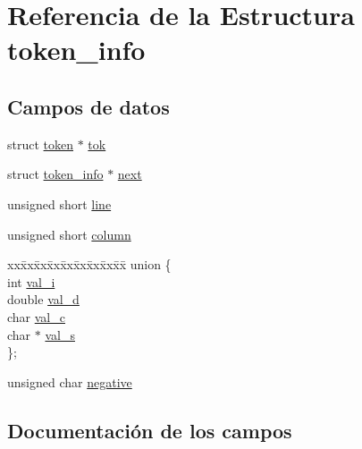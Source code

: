 \hypertarget{structtoken__info}{}\section{Referencia de la Estructura token\+\_\+info}
\label{structtoken__info}
\subsection*{Campos de datos}
\begin{DoxyCompactItemize}
\item 
struct \mbox{\hyperlink{structtoken}{token}} $\ast$ \mbox{\hyperlink{structtoken__info_a55f2da03def99d2cd8adb1f2d5cb1eb9}{tok}}
\item 
struct \mbox{\hyperlink{structtoken__info}{token\+\_\+info}} $\ast$ \mbox{\hyperlink{structtoken__info_a8ae533e40ed837711592f2ccd0fbdaa7}{next}}
\item 
unsigned short \mbox{\hyperlink{structtoken__info_a12da61ba70beb7fda26fb3c1703b7b12}{line}}
\item 
unsigned short \mbox{\hyperlink{structtoken__info_aa711ac8c1fc3d2cc6a64e13bda8993f4}{column}}
\item 
\begin{tabbing}
xx\=xx\=xx\=xx\=xx\=xx\=xx\=xx\=xx\=\kill
union \{\\
\>int \mbox{\hyperlink{structtoken__info_a5aca99878d252001e7155853bef92c02}{val\_i}}\\
\>double \mbox{\hyperlink{structtoken__info_aec49de79a01a725b253eaeceb7e6b22c}{val\_d}}\\
\>char \mbox{\hyperlink{structtoken__info_a0928ec52e0db63dd228e929167c777cd}{val\_c}}\\
\>char $\ast$ \mbox{\hyperlink{structtoken__info_aa00629ea53975a7720bbe8c50637ce1c}{val\_s}}\\
\}; \\

\end{tabbing}\item 
unsigned char \mbox{\hyperlink{structtoken__info_aaf4c2889c4560c02792fa4cf4b0fe522}{negative}}
\end{DoxyCompactItemize}


\subsection{Documentación de los campos}
\mbox{\label{structtoken__info_a4b9d7d7970bf4f34c6e44b1e86218f27}} 
